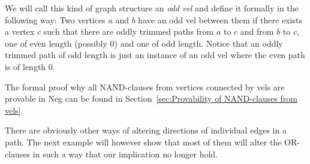 We will call this kind of graph structure an \textit{odd vel} and define it formally in the following way:
Two vertices $a$ and $b$ have an odd vel between them if there exists a vertex $c$ such that there are oddly trimmed paths from $a$ to $c$ and from $b$ to $c$, one of even length (possibly 0) and one of odd length.
Notice that an oddly trimmed path of odd length is just an instance of an odd vel where the even path is of length 0.

The formal proof why all NAND-clauses from vertices connected by vels are provable in Neg can be found in Section~\ref{sec:Provability of NAND-clauses from vels}.

There are obviously other ways of altering directions of individual edges in a path.
The next example will however show that most of them will alter the OR-clauses in such a way that our implication no longer hold.

